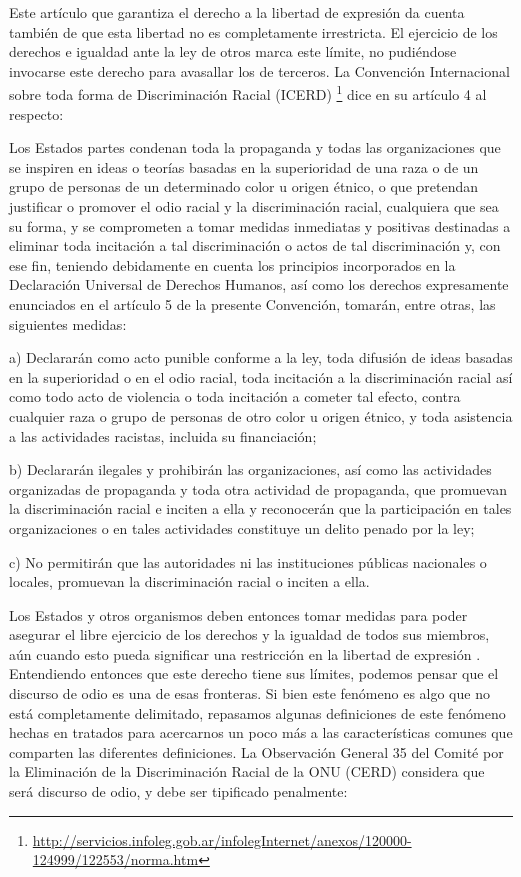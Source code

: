 Este artículo que garantiza el derecho a la libertad de expresión da cuenta también de que esta libertad no es completamente irrestricta. El ejercicio de los derechos e igualdad ante la ley de otros marca este límite, no pudiéndose invocarse este derecho para avasallar los de terceros. La Convención Internacional sobre toda forma de Discriminación Racial (ICERD) \footnote{\url{http://servicios.infoleg.gob.ar/infolegInternet/anexos/120000-124999/122553/norma.htm}} dice en su artículo 4 al respecto:

\begin{displayquote}

Los Estados partes condenan toda la propaganda y todas las organizaciones que se inspiren en ideas o teorías basadas en la superioridad de una raza o de un grupo de personas de un determinado color u origen étnico, o que pretendan justificar o promover el odio racial y la discriminación racial, cualquiera que sea su forma, y se comprometen a tomar medidas inmediatas y positivas destinadas a eliminar toda incitación a tal discriminación o actos de tal discriminación y, con ese fin, teniendo debidamente en cuenta los principios incorporados en la Declaración Universal de Derechos Humanos, así como los derechos expresamente enunciados en el artículo 5 de la presente Convención, tomarán, entre otras, las siguientes medidas:

a) Declararán como acto punible conforme a la ley, toda difusión de ideas basadas en la superioridad o en el odio racial, toda incitación a la discriminación racial así como todo acto de violencia o toda incitación a cometer tal efecto, contra cualquier raza o grupo de personas de otro color u origen étnico, y toda asistencia a las actividades racistas, incluida su financiación;

b) Declararán ilegales y prohibirán las organizaciones, así como las actividades organizadas de propaganda y toda otra actividad de propaganda, que promuevan la discriminación racial e inciten a ella y reconocerán que la participación en tales organizaciones o en tales actividades constituye un delito penado por la ley;

c) No permitirán que las autoridades ni las instituciones públicas nacionales o locales, promuevan la discriminación racial o inciten a ella.
\end{displayquote}


Los Estados y otros organismos deben entonces tomar medidas para poder asegurar el libre ejercicio de los derechos y la igualdad de todos sus miembros, aún cuando esto pueda significar una restricción en la libertad de expresión \cite{article192015}. Entendiendo entonces que este derecho tiene sus límites, podemos pensar que el discurso de odio es una de esas fronteras. Si bien este fenómeno es algo que no está completamente delimitado, repasamos algunas definiciones de este fenómeno hechas en tratados para acercarnos un poco más a las características comunes que comparten las diferentes definiciones. La Observación General 35 del Comité por la Eliminación de la Discriminación Racial de la ONU (CERD) considera que será discurso de odio, y debe ser tipificado penalmente:

